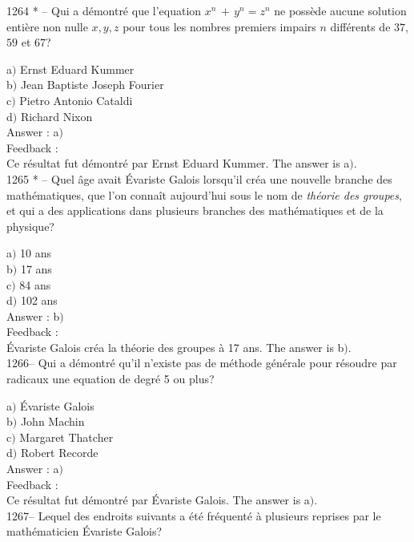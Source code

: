\documentclass[letterpaper, 12pt]{article}
\begin{document}
1264 * -- Qui a d\'emontr\'e que l'equation $x^n\,+\,y^n=z^n$ ne
poss\`ede aucune solution enti\`ere non nulle $x,y,z$ pour tous les
nombres premiers impairs $n$ diff\'erents de $37$, $59$ et $67$?

a$)$ Ernst Eduard Kummer \\
b$)$ Jean Baptiste Joseph Fourier \\
c$)$ Pietro Antonio Cataldi \\
d$)$ Richard Nixon\\

Answer : a$)$\\

Feedback : \\
Ce r\'esultat fut d\'emontr\'e par Ernst Eduard Kummer.
The answer is a$)$.\\

1265 * -- Quel \^age avait \'Evariste Galois lorsqu'il cr\'ea une
nouvelle branche des math\'ematiques, que l'on conna\^it aujourd'hui
sous le nom de {\sl th\'eorie des groupes}, et qui a des
applications dans plusieurs branches des math\'ematiques et de la
physique?

a$)$ 10 ans \\
b$)$ 17 ans \\
c$)$ 84 ans \\
d$)$ 102 ans\\

Answer : b$)$\\

Feedback : \\
\'Evariste Galois cr\'ea la th\'eorie des groupes \`a 17 ans.
The answer is b$)$.\\

1266-- Qui a d\'emontr\'e qu'il n'existe pas de m\'ethode
g\'en\'erale pour r\'esoudre par radicaux une equation de degr\'e
5 ou plus?

a$)$ \'Evariste Galois \\
b$)$ John Machin \\
c$)$ Margaret Thatcher \\
d$)$ Robert Recorde\\

Answer : a$)$\\

Feedback : \\
Ce r\'esultat fut d\'emontr\'e par \'Evariste Galois.
The answer is a$)$.\\

1267-- Lequel des endroits suivants a \'et\'e fr\'equent\'e \`a
plusieurs reprises par le math\'ematicien \'Evariste Galois?
\end{document}

